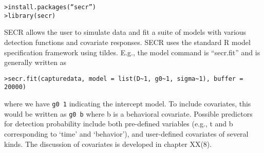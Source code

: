 \begin{verbatim}
>install.packages(“secr”)
>library(secr)
\end{verbatim}

SECR allows the user to simulate data and fit a suite of models with
various detection functions and covariate responses.  SECR uses the
standard R model specification framework using tildes. E.g., the model
command is “secr.fit” and is generally written as

\begin{verbatim}
>secr.fit(capturedata, model = list(D~1, g0~1, sigma~1), buffer = 20000)
\end{verbatim}

where we have \mbox{\tt g0~1} indicating the intercept model.  To include
covariates, this would be written as \mbox{\tt g0~b} where b is a behavioral
covariate.  Possible predictors for detection probability include both
pre-defined variables (e.g., t and b corresponding to ‘time’ and
‘behavior’), and user-defined covariates of several kinds. The
discussion of covariates is developed in chapter XX(8).

